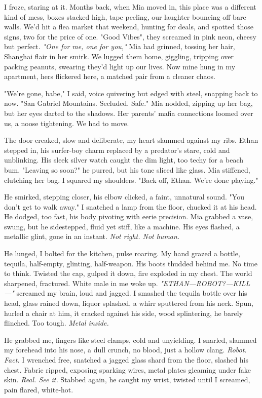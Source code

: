 \documentclass[12pt,oneside]{book} %
\begin{document}
I froze, staring at it. Months back, when Mia moved in, this place was a different kind of mess, boxes stacked high, tape peeling, our laughter bouncing off bare walls. We’d hit a flea market that weekend, hunting for deals, and spotted those signs, two for the price of one. "Good Vibes", they screamed in pink neon, cheesy but perfect. \textit{"One for me, one for you,"} Mia had grinned, tossing her hair, Shanghai flair in her smirk. We lugged them home, giggling, tripping over packing peanuts, swearing they’d light up our lives. Now mine hung in my apartment, hers flickered here, a matched pair from a cleaner chaos.

"We’re gone, babe," I said, voice quivering but edged with steel, snapping back to now. "San Gabriel Mountains. Secluded. Safe." Mia nodded, zipping up her bag, but her eyes darted to the shadows. Her parents’ mafia connections loomed over us, a noose tightening. We had to move.

The door creaked, slow and deliberate, my heart slammed against my ribs. Ethan stepped in, his surfer-boy charm replaced by a predator’s stare, cold and unblinking. His sleek silver watch caught the dim light, too techy for a beach bum. "Leaving so soon?" he purred, but his tone sliced like glass. Mia stiffened, clutching her bag. I squared my shoulders. "Back off, Ethan. We’re done playing."

He smirked, stepping closer, his elbow clicked, a faint, unnatural sound. "You don’t get to walk away." I snatched a lamp from the floor, chucked it at his head. He dodged, too fast, his body pivoting with eerie precision. Mia grabbed a vase, swung, but he sidestepped, fluid yet stiff, like a machine. His eyes flashed, a metallic glint, gone in an instant. \textit{Not right. Not human.}

He lunged, I bolted for the kitchen, pulse roaring. My hand grazed a bottle, tequila, half-empty, glinting, half-weapon. His boots thudded behind me. No time to think. Twisted the cap, gulped it down, fire exploded in my chest. The world sharpened, fractured. White male in me woke up. \textit{"ETHAN—ROBOT?—KILL—"} screamed my brain, loud and jagged. I smashed the tequila bottle over his head, glass rained down, liquor splashed, a whirr sputtered from his neck. Spun, hurled a chair at him, it cracked against his side, wood splintering, he barely flinched. Too tough. \textit{Metal inside.}

He grabbed me, fingers like steel clamps, cold and unyielding. I snarled, slammed my forehead into his nose, a dull crunch, no blood, just a hollow clang. \textit{Robot. Fact.} I wrenched free, snatched a jagged glass shard from the floor, slashed his chest. Fabric ripped, exposing sparking wires, metal plates gleaming under fake skin. \textit{Real. See it.} Stabbed again, he caught my wrist, twisted until I screamed, pain flared, white-hot.
\end{document}
